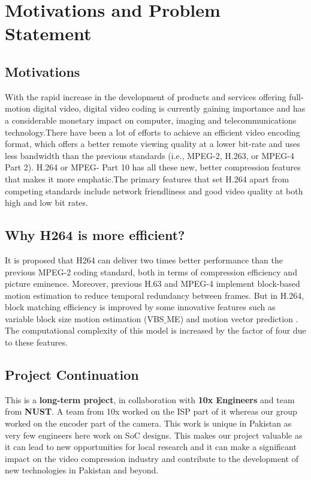 
\chapter{Motivations and Problem Statement} %
\label{Chapter2}

\section{Motivations}

With the rapid increase in the development of products and services offering full-motion digital video, digital video coding is currently gaining importance and has a considerable monetary impact on computer, imaging and telecommunications technology.There have been a lot of efforts to achieve an efficient video encoding format, which offers a better remote viewing quality at a lower bit-rate and uses less bandwidth than the previous standards (i.e., MPEG-2, H.263, or MPEG-4 Part 2). H.264 or MPEG- Part 10 has all these new, better compression features that makes it more emphatic.The primary features that set H.264 apart from competing standards include network friendliness and good video quality at both high and low bit rates. \cite{amer2005high} 

\section{Why H264 is more efficient?}

It is proposed that H264 can deliver two times better performance than the previous MPEG-2 coding standard, both in terms of compression efficiency and picture eminence. Moreover, previous H.63 and MPEG-4 implement block-based motion estimation to reduce temporal redundancy between frames. But in H.264, block matching efficiency is improved by some innovative features such as variable block size motion estimation (VBS$\_$ME) and motion vector prediction \cite{li2003serial}. The computational complexity of this model is increased by the factor of four due to these features.

\section{Project Continuation}

This is a \textbf{long-term project}, in collaboration with \textbf{10x Engineers} and team from \textbf{NUST}. A team from 10x worked on the ISP part of it whereas our group worked on the encoder part of the camera. This work is unique in Pakistan as very few engineers here work on SoC designs. This makes our project valuable as it can lead to new opportunities for local research and it can make a significant impact on the video compression industry and contribute to the development of new technologies in Pakistan and beyond.

